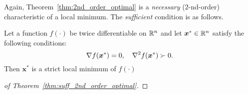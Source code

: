 Again, Theorem~\ref{thm:2nd_order_optimal} is a \emph{necessary} (\(2\)-nd-order) characteristic of a local minimum. The \emph{sufficient} condition is as follows.

\begin{thm}\label{thm:suff_2nd_order_optimal}
    Let a function \(f(\cdot)\) be twice differentiable on \(\mathbb{R}^n\) and let \(\bm{x}^* \in \mathbb{R}^n\) satisfy the following conditions:
    \begin{equation}
        \grad f(\bm{x}^*) = 0, \quad \hess f(\bm{x}^*) \succ 0.
    \end{equation}
    Then \(\bm{x}^*\) is a strict local minimum of \(f(\cdot)\)
\end{thm}

\begin{proof}[of Theorem~\ref{thm:suff_2nd_order_optimal}]
    
\end{proof}